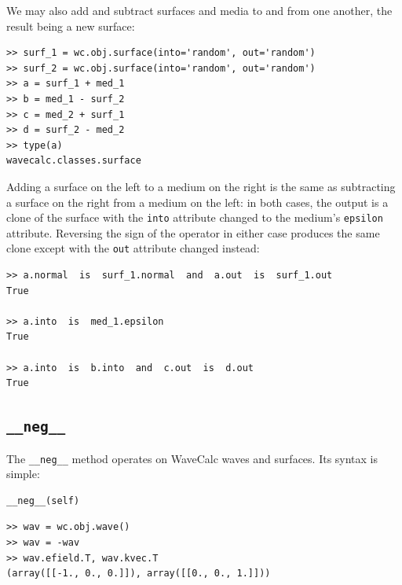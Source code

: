 \documentclass[11pt, reqno]{book}%
\newcounter{ct}
\newcommand{\tw}[1]{{\tt #1}}
\begin{document}
We may also add and subtract surfaces and media to and from one another, the result being a new surface:
\begin{verbatim}
>> surf_1 = wc.obj.surface(into='random', out='random')
>> surf_2 = wc.obj.surface(into='random', out='random')
>> a = surf_1 + med_1
>> b = med_1 - surf_2
>> c = med_2 + surf_1
>> d = surf_2 - med_2
>> type(a)
wavecalc.classes.surface
\end{verbatim}
\noindent Adding a surface on the left to a medium on the right is the same as subtracting a surface on the right from a medium on the left: in both cases, the output is a clone of the surface with the \tw{into} attribute changed to the medium's \tw{epsilon} attribute. Reversing the sign of the operator in either case produces the same clone except with the \tw{out} attribute changed instead:
\begin{verbatim}
>> a.normal  is  surf_1.normal  and  a.out  is  surf_1.out
True

>> a.into  is  med_1.epsilon
True

>> a.into  is  b.into  and  c.out  is  d.out
True
\end{verbatim}









\subsection{\tw{\_\_neg\_\_} }
\label{sec:negmethod}

The \tw{\_\_neg\_\_} method operates on WaveCalc waves and surfaces. Its syntax is simple:
\begin{verbatim}
__neg__(self)
\end{verbatim}

\begin{verbatim}
>> wav = wc.obj.wave()
>> wav = -wav
>> wav.efield.T, wav.kvec.T
(array([[-1., 0., 0.]]), array([[0., 0., 1.]]))
\end{verbatim}










\end{document}
